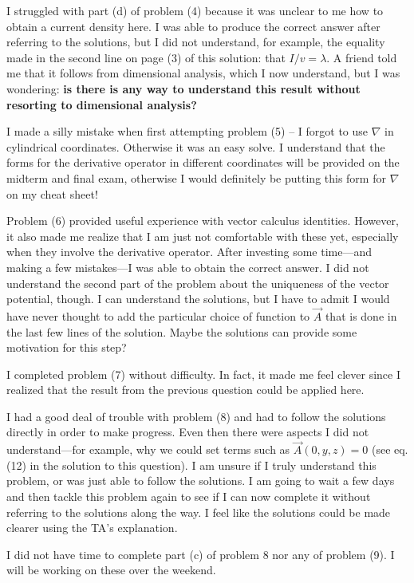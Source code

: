 I struggled with part (d) of problem (4) because it was unclear to me how to obtain a current density here.  I was able to produce the correct answer after referring to the solutions, but I did not understand, for example, the equality made in the second line on page (3) of this solution: that $I/v = \lambda$.  A friend told me that it follows from dimensional analysis, which I now understand, but I was wondering: \textbf{ is there is any way to understand this result without resorting to dimensional analysis?}

I made a silly mistake when first attempting problem (5) -- I forgot to use $\nabla$ in cylindrical coordinates. Otherwise it was an easy solve. I understand that the forms for the derivative operator in different coordinates will be provided on the midterm and final exam, otherwise I would definitely be putting this form for $\nabla$ on my cheat sheet!

Problem (6) provided useful experience with vector calculus identities.  However, it also made me realize that I am just not comfortable with these yet, especially when they involve the derivative operator.  After investing some time---and making a few mistakes---I was able to obtain the correct answer.  I did not understand the second part of the problem about the uniqueness of the vector potential, though.  I can understand the solutions, but I have to admit I would have never thought to add the particular choice of function to $\vec{A}$ that is done in the last few lines of the solution. Maybe the solutions can provide some motivation for this step?

I completed problem (7) without difficulty.  In fact, it made me feel clever since I realized that the result from the previous question could be applied here.

I had a good deal of trouble with problem (8) and had to follow the solutions directly in order to make progress.  Even then there were aspects I did not understand---for example, why we could set terms such as $\vec{A}(0,y,z)=0$ (see eq. (12) in the solution to this question).  I am unsure if I truly understand this problem, or was just able to follow the solutions.  I am going to wait a few days and then tackle this problem again to see if I can now complete it without referring to the solutions along the way. I feel like the solutions could be made clearer using the TA's explanation.

I did not have time to complete part (c) of problem 8 nor any of problem (9).  I will be working on these over the weekend.

